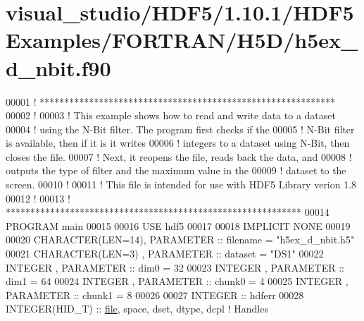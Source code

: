 \hypertarget{visual__studio_2_h_d_f5_21_810_81_2_h_d_f5_examples_2_f_o_r_t_r_a_n_2_h5_d_2h5ex__d__nbit_8f90_source}{}\section{visual\+\_\+studio/\+H\+D\+F5/1.10.1/\+H\+D\+F5\+Examples/\+F\+O\+R\+T\+R\+A\+N/\+H5\+D/h5ex\+\_\+d\+\_\+nbit.f90}
\label{visual__studio_2_h_d_f5_21_810_81_2_h_d_f5_examples_2_f_o_r_t_r_a_n_2_h5_d_2h5ex__d__nbit_8f90_source}

\begin{DoxyCode}
00001 \textcolor{comment}{! ************************************************************}
00002 \textcolor{comment}{!}
00003 \textcolor{comment}{!  This example shows how to read and write data to a dataset}
00004 \textcolor{comment}{!  using the N-Bit filter.  The program first checks if the}
00005 \textcolor{comment}{!  N-Bit filter is available, then if it is it writes}
00006 \textcolor{comment}{!  integers to a dataset using N-Bit, then closes the file.}
00007 \textcolor{comment}{!  Next, it reopens the file, reads back the data, and}
00008 \textcolor{comment}{!  outputs the type of filter and the maximum value in the}
00009 \textcolor{comment}{!  dataset to the screen.}
00010 \textcolor{comment}{!}
00011 \textcolor{comment}{!  This file is intended for use with HDF5 Library verion 1.8}
00012 \textcolor{comment}{!}
00013 \textcolor{comment}{! ************************************************************}
00014 \textcolor{keyword}{PROGRAM} main
00015 
00016   \textcolor{keywordtype}{USE }hdf5
00017 
00018   \textcolor{keywordtype}{IMPLICIT NONE}
00019 
00020   \textcolor{keywordtype}{CHARACTER(LEN=14)}, \textcolor{keywordtype}{PARAMETER} :: filename = \textcolor{stringliteral}{"h5ex\_d\_nbit.h5"}
00021   \textcolor{keywordtype}{CHARACTER(LEN=3)} , \textcolor{keywordtype}{PARAMETER} :: dataset  = \textcolor{stringliteral}{"DS1"}
00022   \textcolor{keywordtype}{INTEGER}          , \textcolor{keywordtype}{PARAMETER} :: dim0     = 32
00023   \textcolor{keywordtype}{INTEGER}          , \textcolor{keywordtype}{PARAMETER} :: dim1     = 64
00024   \textcolor{keywordtype}{INTEGER}          , \textcolor{keywordtype}{PARAMETER} :: chunk0   = 4
00025   \textcolor{keywordtype}{INTEGER}          , \textcolor{keywordtype}{PARAMETER} :: chunk1   = 8
00026 
00027   \textcolor{keywordtype}{INTEGER} :: hdferr
00028   \textcolor{keywordtype}{INTEGER(HID\_T)}  :: \hyperlink{structfile}{file}, space, dset, dtype, dcpl \textcolor{comment}{! Handles}

\end{DoxyCode}
